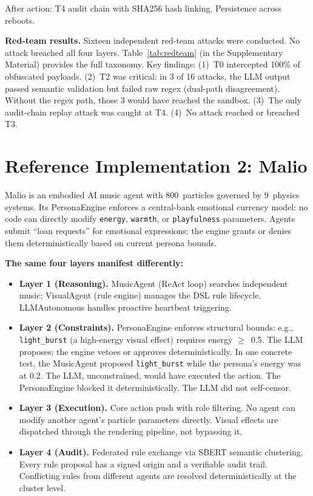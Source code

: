 \documentclass[letterpaper]{article}
\begin{document}
After action: T4 audit chain with SHA256 hash linking.  Persistence across
reboots.

\textbf{Red-team results.}  Sixteen independent red-team attacks were conducted.
No attack breached all four layers.  Table~\ref{tab:redteam} (in the
Supplementary Material) provides the full taxonomy.  Key findings:
(1)~T0 intercepted 100\% of obfuscated payloads.  (2)~T2 was critical: in 3 of
16 attacks, the LLM output passed semantic validation but failed raw regex
(dual-path disagreement).  Without the regex path, those 3 would have reached
the sandbox.  (3)~The only audit-chain replay attack was caught at T4.
(4)~No attack reached or breached T3.

\section{Reference Implementation 2: Malio}

Malio is an embodied AI music agent with 800~particles governed by 9~physics
systems.  Its PersonaEngine enforces a central-bank emotional currency model:
no code can directly modify \texttt{energy}, \texttt{warmth}, or
\texttt{playfulness} parameters.  Agents submit ``loan requests'' for emotional
expressions; the engine grants or denies them deterministically based on
current persona bounds.

\textbf{The same four layers manifest differently:}

\begin{itemize}
\item \textbf{Layer 1 (Reasoning).} MusicAgent (ReAct loop) searches independent
      music; VisualAgent (rule engine) manages the DSL rule lifecycle.
      LLMAutonomous handles proactive heartbeat triggering.
\item \textbf{Layer 2 (Constraints).} PersonaEngine enforces structural bounds:
      e.g., \texttt{light\_burst} (a high-energy visual effect) requires
      energy $\ge$~0.5.  The LLM proposes; the engine vetoes or approves
      deterministically.  In one concrete test, the MusicAgent proposed
      \texttt{light\_burst} while the persona's energy was at 0.2.  The LLM,
      unconstrained, would have executed the action.  The PersonaEngine
      blocked it deterministically.  The LLM did not self-censor.
\item \textbf{Layer 3 (Execution).} Core action push with role filtering.
      No agent can modify another agent's particle parameters directly.
      Visual effects are dispatched through the rendering pipeline, not
      bypassing it.
\item \textbf{Layer 4 (Audit).} Federated rule exchange via SBERT semantic
      clustering.  Every rule proposal has a signed origin and a verifiable
      audit trail.  Conflicting rules from different agents are resolved
      deterministically at the cluster level.
\end{itemize}
\end{document}
